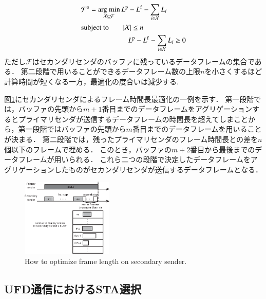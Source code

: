 \documentclass[master]{kuisthesis}		%
\newcommand{\argmin}{\mathop{\rm arg~min}\limits}
\begin{document}
		\begin{align}
			&{\mathcal F}^{\rm s} = \argmin_{{\mathcal X} \subseteq {\mathcal F}} L^{\rm p} - L^{\rm f} - \sum_{i \in {\mathcal X}}L_{i} \\
			&{\rm subject \ to} \qquad |{\mathcal X}| \leq n \\
			&\;\;\qquad\qquad\qquad L^{\rm p} - L^{\rm f} - \sum_{i \in {\mathcal X}} L_{i} \geq 0
		\end{align}
		ただし${\mathcal F}$はセカンダリセンダのバッファに残っているデータフレームの集合である．
		第二段階で用いることができるデータフレーム数の上限$n$を小さくするほど計算時間が短くなる一方，最適化の度合いは減少する.
		\par
		図\ref{fig:opti}にセカンダリセンダによるフレーム時間長最適化の一例を示す．
		第一段階では，バッファの先頭から$m+1$番目までのデータフレームをアグリゲーションするとプライマリセンダが送信するデータフレームの時間長を超えてしまことから，第一段階ではバッファの先頭から$m$番目までのデータフレームを用いることが決まる．
		第二段階では，残ったプライマリセンダのフレーム時間長との差を$n$個以下のフレームで埋める．
		このとき，バッファの$m+2$番目から最後までのデータフレームが用いられる．
		これら二つの段階で決定したデータフレームをアグリゲーションしたものがセカンダリセンダが送信するデータフレームとなる．
		\par

		\begin{figure}[t]
			\begin{center}
				\includegraphics[width=0.39\textwidth]{fig/opti.eps}
				\caption{How to optimize frame length on secondary sender.}
				\label{fig:opti}
			\end{center}
		\end{figure}

	\subsection{UFD通信におけるSTA選択}
\end{document}

